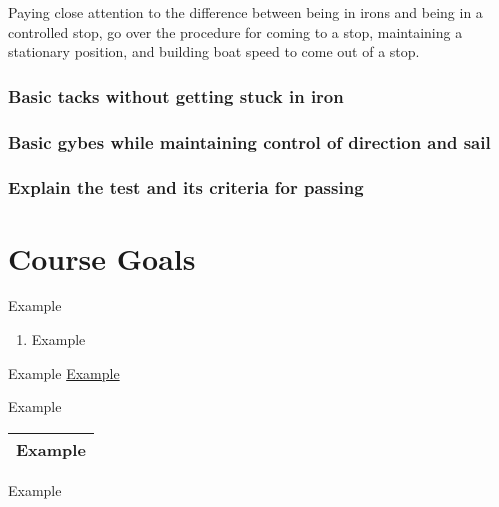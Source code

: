 \documentclass[12pt]{scrartcl}
\begin{document}
Paying close attention to the difference between being in irons and being in a controlled stop, go over the procedure for coming to a stop, maintaining a stationary position, and building boat speed to come out of a stop.

\subsubsection{Basic tacks without getting stuck in iron} \label{subsubsec:tacks}

\subsubsection{Basic gybes while maintaining control of direction and sail} \label{subsubsec:gybe}

\subsubsection{Explain the test and its criteria for passing} \label{subsubsec:test}

\begin{comment}
	Syllabus --- special note setup for teaching tips
		setup
		on water
		packup
		debrief
		packup
	Test --- with checkboxes and final tabulation
	Diagrams & Teaching Aids --- on individual pages for ease of printing
		points of sail
		course
		handouts

\end{comment}

\section{Course Goals} \label{sec:goals}

Example

\begin{enumerate}
	\item Example
\end{enumerate}

Example \hyperlink{example:example}{Example}

\newpage

\begin{landscape}

	Example

	\begin{center}
		\scriptsize{
			\begin{tabularx}{520pt}{|X|}
				\hline
				Example \\
				\hline
			\end{tabularx}
		}
	\end{center}

	Example

\end{landscape}
\end{document}

